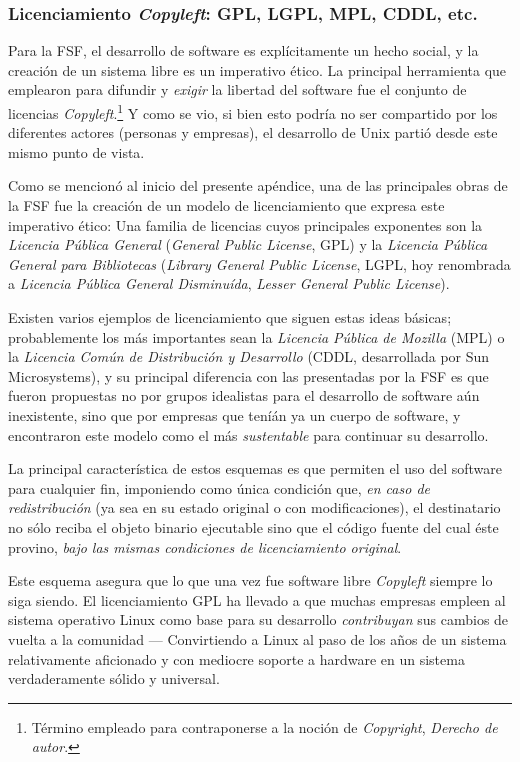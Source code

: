 \documentclass[11pt,fleqn]{book} %
\begin{document}
\subsubsection{Licenciamiento \emph{Copyleft}: GPL, LGPL, MPL, CDDL, etc.}
\label{sec-8-1-4-2}
\label{SL_copyleft}


Para la FSF, el desarrollo de software es explícitamente un hecho
social, y la creación de un sistema libre es un imperativo ético. La
principal herramienta que emplearon para difundir y \emph{exigir} la
libertad del software fue el conjunto de licencias \emph{Copyleft}.\footnote{Término empleado para contraponerse a la noción de \emph{Copyright},
\emph{Derecho de autor}. } Y como se vio, si bien esto podría no ser
compartido por los diferentes actores (personas y empresas), el
desarrollo de Unix partió desde este mismo punto de vista.

Como se mencionó al inicio del presente apéndice, una de las
principales obras de la FSF fue la creación de un modelo de
licenciamiento que expresa este imperativo ético: Una familia de
licencias cuyos principales exponentes son la \emph{Licencia Pública General} (\emph{General Public License}, GPL) y la \emph{Licencia Pública General para Bibliotecas} (\emph{Library General Public License}, LGPL, hoy
renombrada a \emph{Licencia Pública General Disminuída}, \emph{Lesser General Public License}).

Existen varios ejemplos de licenciamiento que siguen estas ideas
básicas; probablemente los más importantes sean la \emph{Licencia Pública de Mozilla} (MPL) o la \emph{Licencia Común de Distribución y Desarrollo}
(CDDL, desarrollada por Sun Microsystems), y su principal diferencia
con las presentadas por la FSF es que fueron propuestas no por grupos
idealistas para el desarrollo de software aún inexistente, sino que
por empresas que teníán ya un cuerpo de software, y encontraron este
modelo como el más \emph{sustentable} para continuar su desarrollo.

La principal característica de estos esquemas es que permiten el uso
del software para cualquier fin, imponiendo como única condición que,
\emph{en caso de redistribución} (ya sea en su estado original o con
modificaciones), el destinatario no sólo reciba el objeto binario
ejecutable sino que el código fuente del cual éste provino, \emph{bajo las mismas condiciones de licenciamiento original}.

Este esquema asegura que lo que una vez fue software libre \emph{Copyleft}
siempre lo siga siendo. El licenciamiento GPL ha llevado a que muchas
empresas empleen al sistema operativo Linux como base para su
desarrollo \emph{contribuyan} sus cambios de vuelta a la comunidad —
Convirtiendo a Linux al paso de los años de un sistema relativamente
aficionado y con mediocre soporte a hardware en un sistema
verdaderamente sólido y universal.
\end{document}
